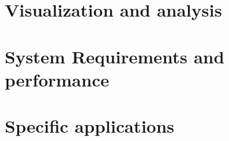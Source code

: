 \documentclass[a4paper,11pt]{report}
\newcommand{\NextFile}[1]{}
\def\umbruch{\vfill\eject}
\def\umbruch{\relax}
\begin{document}
\chapter{Visualization and analysis}
%
\NextFile{SystemRequirements.html}
\chapter{System Requirements and performance}
%
\NextFile{PolicyMeasures.html}
\chapter{Specific applications}


%






\umbruch
\end{document}
